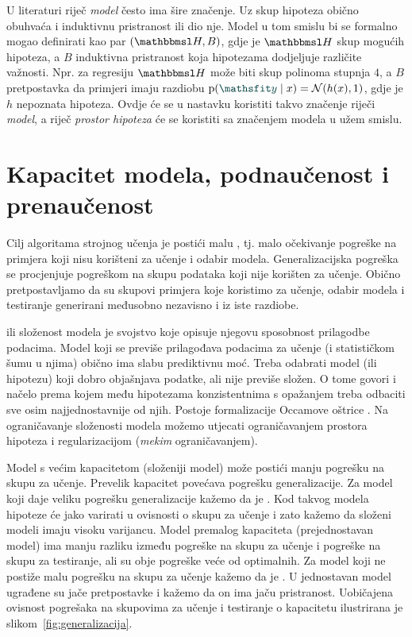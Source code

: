 \documentclass[utf8, diplomski, lmodern]{fer}
\begin{document}
U literaturi riječ \textit{model} često ima šire značenje. Uz skup hipoteza obično obuhvaća i induktivnu pristranost ili dio nje. Model u tom smislu bi se formalno mogao definirati kao par $(\set H, B)$, gdje je $\set H$ skup mogućih hipoteza, a $B$ induktivna pristranost koja hipotezama dodjeljuje različite važnosti. Npr. za regresiju $\set H$ može biti skup polinoma stupnja $4$, a $B$ pretpostavka da primjeri imaju razdiobu $\p(\rvar y\mid x)=\mathcal{N}(h(x),1)$, gdje je $h$ nepoznata hipoteza. Ovdje će se u nastavku koristiti takvo značenje riječi \textit{model}, a riječ \textit{prostor hipoteza} će se koristiti sa značenjem modela u užem smislu.


\section{Kapacitet modela, podnaučenost i prenaučenost}

Cilj algoritama strojnog učenja je postići malu , tj. malo očekivanje pogreške na primjera koji nisu korišteni za učenje i odabir modela. Generalizacijska pogreška se procjenjuje pogreškom na skupu podataka koji nije korišten za učenje. Obično pretpostavljamo da su skupovi primjera koje koristimo za učenje, odabir modela i testiranje generirani međusobno nezavisno i iz iste razdiobe.

 ili složenost modela je svojstvo koje opisuje njegovu sposobnost prilagodbe podacima. Model koji se previše prilagođava podacima za učenje (i statističkom šumu u njima) obično ima slabu prediktivnu moć. Treba odabrati model (ili hipotezu) koji dobro objašnjava podatke, ali nije previše složen. O tome govori i načelo  prema kojem među hipotezama konzistentnima s opažanjem treba odbaciti sve osim najjednostavnije od njih. Postoje formalizacije Occamove oštrice \citep{Blumer:1987:OR,Blumer:1989:LVCD,Gruenwald:2005:TIMDL,Ratmanner:2011:PTUI}. Na ograničavanje složenosti modela možemo utjecati ograničavanjem prostora hipoteza i regularizacijom (\textit{mekim} ograničavanjem).

Model s većim kapacitetom (složeniji model) može postići manju pogrešku na skupu za učenje. Prevelik kapacitet povećava pogrešku generalizacije. Za model koji daje veliku pogrešku generalizacije kažemo da je . Kod takvog modela hipoteze će jako varirati u ovisnosti o skupu za učenje i zato kažemo da složeni modeli imaju visoku varijancu. Model premalog kapaciteta (prejednostavan model) ima manju razliku između pogreške na skupu za učenje i pogreške na skupu za testiranje, ali su obje pogreške veće od optimalnih. Za model koji ne postiže malu pogrešku na skupu za učenje kažemo da je . U jednostavan model ugrađene su jače pretpostavke i kažemo da on ima jaču pristranost. Uobičajena ovisnost pogrešaka na skupovima za učenje i testiranje o kapacitetu ilustrirana je slikom~\ref{fig:generalizacija}.
\end{document}
